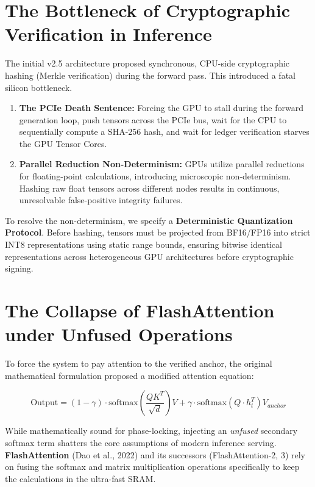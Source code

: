 \documentclass{article}
\begin{document}
\section{The Bottleneck of Cryptographic Verification in Inference}
The initial v2.5 architecture proposed synchronous, CPU-side cryptographic hashing (Merkle verification) during the forward pass. This introduced a fatal silicon bottleneck.

\begin{enumerate}
\item \textbf{The PCIe Death Sentence:} Forcing the GPU to stall during the forward generation loop, push tensors across the PCIe bus, wait for the CPU to sequentially compute a SHA-256 hash, and wait for ledger verification starves the GPU Tensor Cores. 
\item \textbf{Parallel Reduction Non-Determinism:} GPUs utilize parallel reductions for floating-point calculations, introducing microscopic non-determinism. Hashing raw float tensors across different nodes results in continuous, unresolvable false-positive integrity failures.
\end{enumerate}

To resolve the non-determinism, we specify a \textbf{Deterministic Quantization Protocol}. Before hashing, tensors must be projected from BF16/FP16 into strict INT8 representations using static range bounds, ensuring bitwise identical representations across heterogeneous GPU architectures before cryptographic signing.

\section{The Collapse of FlashAttention under Unfused Operations}
To force the system to pay attention to the verified anchor, the original mathematical formulation proposed a modified attention equation:

\begin{equation}
\text{Output} = (1 - \gamma) \cdot \text{softmax}\left(\frac{QK^T}{\sqrt{d}}\right)V + \gamma \cdot \text{softmax}(Q \cdot h_t^T) V_{anchor}
\end{equation}

While mathematically sound for phase-locking, injecting an \emph{unfused} secondary softmax term shatters the core assumptions of modern inference serving. \textbf{FlashAttention} (Dao et al., 2022) and its successors (FlashAttention-2, 3) rely on fusing the softmax and matrix multiplication operations specifically to keep the calculations in the ultra-fast SRAM. 
\end{document}
